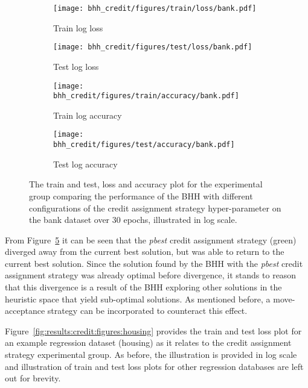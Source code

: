 \begin{figure}[H]
	\begin{subfigure}{0.5\textwidth}
		\centering
		\texttt{[image: bhh\_credit/figures/train/loss/bank.pdf]}
		\caption{Train log loss}
		\label{fig:results:credit:figures:loss:train:bank}
	\end{subfigure}
	\begin{subfigure}{0.5\textwidth}
		\centering
		\texttt{[image: bhh\_credit/figures/test/loss/bank.pdf]}
		\caption{Test log loss}
		\label{fig:results:credit:figures:loss:test:bank}
	\end{subfigure}
	\par\bigskip
	\begin{subfigure}{0.5\textwidth}
		\centering
		\texttt{[image: bhh\_credit/figures/train/accuracy/bank.pdf]}
		\caption{Train log accuracy}
		\label{fig:results:credit:figures:accuracy:train:bank}
	\end{subfigure}
	\begin{subfigure}{0.5\textwidth}
		\centering
		\texttt{[image: bhh\_credit/figures/test/accuracy/bank.pdf]}
		\caption{Test log accuracy}
		\label{fig:results:credit:figures:accuracy:test:bank}
	\end{subfigure}
	\par\bigskip
	\caption{The train and test, loss and accuracy plot for the experimental group comparing the performance of the \acs{BHH} with different configurations of the credit assignment strategy hyper-parameter on the bank dataset over 30 epochs, illustrated in log scale.}
	\label{fig:results:credit:figures:bank}
\end{figure}

From Figure~\ref{fig:results:credit:figures:bank} it can be seen that the \textit{pbest} credit assignment strategy (green) diverged away from the current best solution, but was able to return to the current best solution. Since the solution found by the \acs{BHH} with the \textit{pbest} credit assignment strategy was already optimal before divergence, it stands to reason that this divergence is a result of the \acs{BHH} exploring other solutions in the heuristic space that yield sub-optimal solutions. As mentioned before, a move-acceptance strategy can be incorporated to counteract this effect.

Figure~\ref{fig:results:credit:figures:housing} provides the train and test loss plot for an example regression dataset (housing) as it relates to the credit assignment strategy experimental group. As before, the illustration is provided in log scale and illustration of train and test loss plots for other regression databases are left out for brevity.

